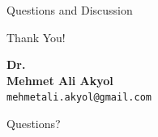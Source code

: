 \documentclass[11pt]{beamer}
\begin{document}
\begin{frame}{Questions and Discussion}
    \begin{center}
    {\Huge Thank You!}
    \vspace{1cm}

      \textbf{Dr.\\ Mehmet Ali Akyol}\\
      \texttt{mehmetali.akyol@gmail.com}
    \vspace{1cm}
    
    {\large Questions?}
    \end{center}
\end{frame}
\end{document}
